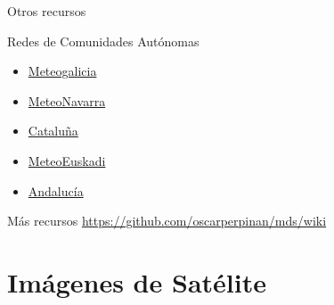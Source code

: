 \documentclass[aspectratio=169, usenames,svgnames,dvipsnames]{beamer}
\begin{document}
\begin{frame}[label={sec:org817b47b}]{Otros recursos}
\begin{block}{Redes de Comunidades Autónomas}
\begin{itemize}
\item \href{https://www.meteogalicia.gal/observacion/estacions/estacions.action?request\_locale=es}{Meteogalicia}
\item \href{http://meteo.navarra.es/estaciones/mapadeestaciones.cfm}{MeteoNavarra}
\item \href{http://www.meteo.cat/observacions/xema}{Cataluña}
\item \href{https://www.euskalmet.euskadi.eus/s07-5853x/es/meteorologia/datos/mapaesta.apl?e=5}{MeteoEuskadi}
\item \href{http://www.juntadeandalucia.es/medioambiente/servtc5/WebClima/?lr\%3Dlang\_es}{Andalucía}
\end{itemize}
\end{block}
\begin{block}{Más recursos}
\url{https://github.com/oscarperpinan/mds/wiki}
\end{block}
\end{frame}
\section{Imágenes de Satélite}
\label{sec:org33b3bd7}
\end{document}

